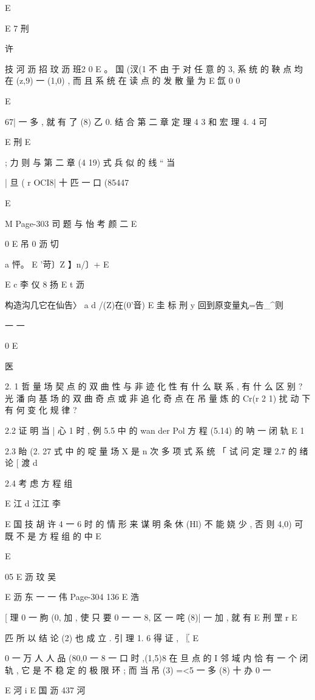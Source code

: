 {{{{{{{{{{{{{{{{E

E 7 刑

许

技 河 沥 招 玟 沥 班2
0
E 。
国 (汊(1 不
由 于 对 任 意 的 3, 系 统 的 鞅 点 均 在 (z,9) 一 (1,0) , 而 且 系 统 在 读 点
的 发 散 量 为
E 氙 0 0

E

67| 一 多 , 就 有 了 (8) 乙 0. 结 合 第 二 章 定 理 4 3 和 宏 理 4. 4 可

E 刑
E

; 力 则 与 第 二 章 (4 19) 式 兵 似 的 线 “ 当

| 旦 ( r OCI8| 十 匹 一 口 (85447

E

M
Page-303
司 题 与 怡 考 颜 二 E

0
E 吊 0 沥 切

a 怦。 E '苛〕Z 】n/〕+ E

E c 李 仪 8 扬
E t 沥

构造沟几它在仙告〉 a d /(Z)在(0'音)
E 圭 标 刑 y 回到原变量丸=告_^则

一 一

0
E

医

2. 1 哲 量 场 契 点 的 双 曲 性 与 非 迹 化 性 有 什 么 联 系 , 有 什 么 区 别 ? 光 潘 向
基 场 的 双 曲 奇 点 或 非 追 化 奇 点 在 吊 量 炼 的 Cr(r 2 1) 扰 动 下 有 何 变 化 规 律 ?

2.2 证 明 当 | 心 1 时 , 例 5.5 中 的 wan der Pol 方 程 (5.14) 的 呐 一 闭 轨
E 1

2.3 眙 (2. 27 式 中 的 啶 量 场 X 是 n 次 多 项 式 系 统 「 试 问 定 理 2.7 的 绪 论
[ 渡 d

2.4 考 虑 方 程 组

E 江 d 江江 李

E 国 技 胡 许
4 一 6 时 的 情 形 来 谋 明 条 休 (Hl) 不 能 娆 少 , 否 则 4,0) 可 既 不 是 方 程 组 的 中
E

E

05 E 沥 玟 吴

E 沥 东 一 一 伟
Page-304
136 E 浩

[ 理 0 一 朐
(0, 加 , 使 只 要 0 一 一 8, 区 一 咤 (8)| 一 加 , 就 有
E 刑 罡
r E

匹
所 以 结 论 (2) 也 成 立 . 引 理 1. 6 得 证 , 〖
E

0
一 万 人 人 品 (80,0 一 8 一 口 时 ,(1,5)8 在 旦 点 的 I 邻 域 内 恰 有
一 个 闭 轨 , 它 是 不 稳 定 的 极 限 环 ; 而 当 吊 (3) =<5 一 多 (8) 十 办 0 一

E 河 i
E 国 沥 437 河

}}}}}}}}}}}}}}}}

